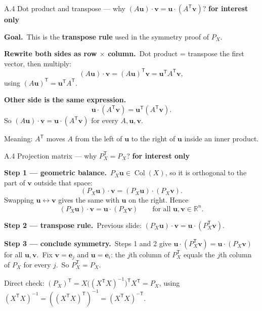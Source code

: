 \documentclass[11pt,aspectratio=169]{beamer}
\newcommand{\InterestOnly}{\textcolor{mAccent}{\textbf{for interest only}}}
\begin{document}
\begin{frame}{A.4 Dot product and transpose --- why $(A\mathbf{u})\cdot\mathbf{v}=\mathbf{u}\cdot(A^{\mathsf T}\mathbf{v})$?}
  \footnotesize
  \InterestOnly

  \medskip
  \textbf{Goal.}\
  This is the \textbf{transpose rule} used in the symmetry proof of $P_X$.

  \medskip
  \textbf{Rewrite both sides as row $\times$ column.}\
  Dot product = transpose the first vector, then multiply:
  \[
    (A\mathbf{u})\cdot\mathbf{v}
    =(A\mathbf{u})^{\mathsf T}\mathbf{v}
    =\mathbf{u}^{\mathsf T}A^{\mathsf T}\mathbf{v},
  \]
  using $(A\mathbf{u})^{\mathsf T}=\mathbf{u}^{\mathsf T}A^{\mathsf T}$.

  \medskip
  \textbf{Other side is the same expression.}\
  \[
    \mathbf{u}\cdot(A^{\mathsf T}\mathbf{v})
    =\mathbf{u}^{\mathsf T}(A^{\mathsf T}\mathbf{v}).
  \]
  So $(A\mathbf{u})\cdot\mathbf{v}=\mathbf{u}\cdot(A^{\mathsf T}\mathbf{v})$ for every $A,\mathbf{u},\mathbf{v}$.

  \medskip
  {\scriptsize Meaning: $A^{\mathsf T}$ moves $A$ from the left of $\mathbf{u}$ to the right of $\mathbf{u}$ inside an inner product.}
\end{frame}

\begin{frame}{A.4 Projection matrix --- why $P_X^{\mathsf T}=P_X$?}
  \footnotesize
  \InterestOnly

  \medskip
  \textbf{Step 1 --- geometric balance.}\
  $P_X\mathbf{u}\in\operatorname{Col}(X)$, so it is orthogonal to the part of $\mathbf{v}$ outside that space:
  \[
    (P_X\mathbf{u})\cdot\mathbf{v}=(P_X\mathbf{u})\cdot(P_X\mathbf{v}).
  \]
  Swapping $\mathbf{u}\leftrightarrow\mathbf{v}$ gives the same with $\mathbf{u}$ on the right. Hence
  \[
    (P_X\mathbf{u})\cdot\mathbf{v}=\mathbf{u}\cdot(P_X\mathbf{v})
    \qquad\text{for all }\mathbf{u},\mathbf{v}\in\mathbb{R}^n.
  \]

  \medskip
  \textbf{Step 2 --- transpose rule.}\
  Previous slide: $(P_X\mathbf{u})\cdot\mathbf{v}=\mathbf{u}\cdot(P_X^{\mathsf T}\mathbf{v})$.

  \medskip
  \textbf{Step 3 --- conclude symmetry.}\
  Steps 1 and 2 give $\mathbf{u}\cdot(P_X^{\mathsf T}\mathbf{v})=\mathbf{u}\cdot(P_X\mathbf{v})$ for all $\mathbf{u},\mathbf{v}$.\
  Fix $\mathbf{v}=\mathbf{e}_j$ and $\mathbf{u}=\mathbf{e}_i$: the $j$th column of $P_X^{\mathsf T}$ equals the $j$th column of $P_X$ for every $j$.\
  So $P_X^{\mathsf T}=P_X$.

  \medskip
  {\scriptsize Direct check: $(P_X)^{\mathsf T}=X\bigl((X^{\mathsf T}X)^{-1}\bigr)^{\mathsf T}X^{\mathsf T}=P_X$, using $(X^{\mathsf T}X)^{-1}=((X^{\mathsf T}X)^{\mathsf T})^{-1}=(X^{\mathsf T}X)^{-\mathsf T}$.}
\end{frame}
\end{document}
